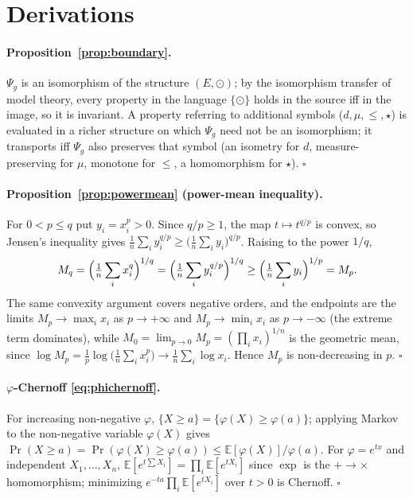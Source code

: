 \documentclass[11pt,a4paper]{article}
\newcommand{\E}{\mathbb{E}}
\theoremstyle{plain}
\theoremstyle{definition}
\theoremstyle{remark}
\begin{document}
\appendix

\section{Derivations}
\label{app:derivations}

\paragraph{Proposition~\ref{prop:boundary}.} $\Psi_g$ is an isomorphism of the
structure $(E,\odot)$; by the isomorphism transfer of model theory, every
property in the language $\{\odot\}$ holds in the source iff in the image, so it
is invariant. A property referring to additional symbols
($d,\mu,\le,\star$) is evaluated in a richer structure on which $\Psi_g$ need
not be an isomorphism; it transports iff $\Psi_g$ also preserves that symbol
(an isometry for $d$, measure-preserving for $\mu$, monotone for $\le$, a
homomorphism for $\star$). $\square$

\paragraph{Proposition~\ref{prop:powermean} (power-mean inequality).} For $0<p\le q$ put
$y_i=x_i^{p}>0$. Since $q/p\ge1$, the map $t\mapsto t^{q/p}$ is convex, so Jensen's inequality gives
$\tfrac1n\sum_i y_i^{q/p}\ge\bigl(\tfrac1n\sum_i y_i\bigr)^{q/p}$. Raising to the power $1/q$,
\[
M_q=\Bigl(\tfrac1n\sum_i x_i^{q}\Bigr)^{1/q}=\Bigl(\tfrac1n\sum_i y_i^{q/p}\Bigr)^{1/q}
\ge\Bigl(\tfrac1n\sum_i y_i\Bigr)^{1/p}=M_p .
\]
The same convexity argument covers negative orders, and the endpoints are the limits $M_p\to\max_i x_i$ as
$p\to+\infty$ and $M_p\to\min_i x_i$ as $p\to-\infty$ (the extreme term dominates), while
$M_0=\lim_{p\to0}M_p=(\prod_i x_i)^{1/n}$ is the geometric mean, since
$\log M_p=\tfrac1p\log\bigl(\tfrac1n\sum_i x_i^{p}\bigr)\to\tfrac1n\sum_i\log x_i$. Hence $M_p$ is
non-decreasing in $p$. $\square$

\paragraph{$\varphi$-Chernoff \eqref{eq:phichernoff}.} For increasing
non-negative $\varphi$, $\{X\ge a\}=\{\varphi(X)\ge\varphi(a)\}$; applying
Markov to the non-negative variable $\varphi(X)$ gives
$\Pr(X\ge a)=\Pr(\varphi(X)\ge\varphi(a))\le\E[\varphi(X)]/\varphi(a)$. For
$\varphi=e^{tx}$ and independent $X_1,\dots,X_n$,
$\E[e^{t\sum X_i}]=\prod_i\E[e^{tX_i}]$ since $\exp$ is the $+\to\times$
homomorphism; minimizing $e^{-ta}\prod_i\E[e^{tX_i}]$ over $t>0$ is Chernoff.
$\square$
\end{document}
